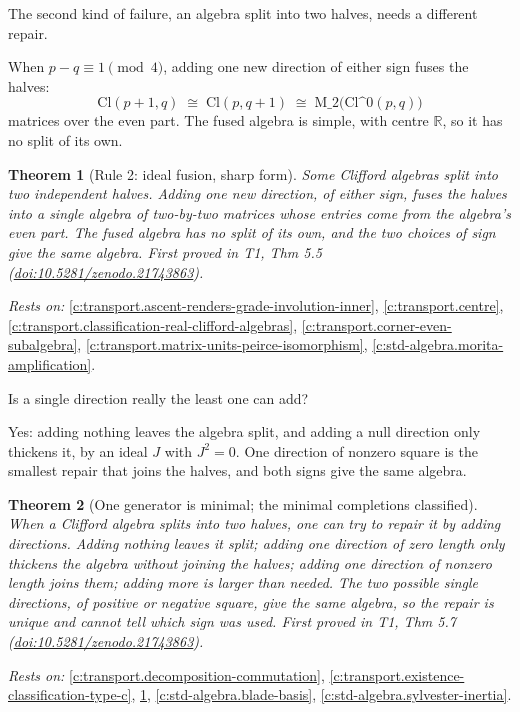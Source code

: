 \documentclass[11pt]{article}
\newtheorem{theorem}{Theorem}[section]
\theoremstyle{definition}
\theoremstyle{plain}
\providecommand{\Cl}{}\renewcommand{\Cl}{\mathrm{Cl}}
\providecommand{\Mat}{}\renewcommand{\Mat}{\mathrm{M}}
\providecommand{\R}{}\renewcommand{\R}{\mathbb{R}}
\begin{document}
The second kind of failure, an algebra split into two halves, needs a different repair.

When $p - q \equiv 1 \pmod 4$, adding one new direction of either sign fuses the halves: \[ \Cl(p{+}1,q) \;\cong\; \Cl(p,q{+}1) \;\cong\; \Mat\_2\bigl(\Cl\^{}0(p,q)\bigr) \] matrices over the even part. The fused algebra is simple, with centre $\R$, so it has no split of its own.

\begin{theorem}[Rule 2: ideal fusion, sharp form]\label{c:transport.rule-2-ideal-fusion-sharp-form}
Some Clifford algebras split into two independent halves. Adding one new direction, of either sign, fuses the halves into a single algebra of two-by-two matrices whose entries come from the algebra's even part. The fused algebra has no split of its own, and the two choices of sign give the same algebra.
\emph{First proved in} T1, Thm 5.5 (\href{https://doi.org/10.5281/zenodo.21743863}{doi:10.5281/zenodo.21743863}).
\end{theorem}
\noindent\emph{Rests on:} \ref{c:transport.ascent-renders-grade-involution-inner}, \ref{c:transport.centre}, \ref{c:transport.classification-real-clifford-algebras}, \ref{c:transport.corner-even-subalgebra}, \ref{c:transport.matrix-units-peirce-isomorphism}, \ref{c:std-algebra.morita-amplification}.

Is a single direction really the least one can add?

Yes: adding nothing leaves the algebra split, and adding a null direction only thickens it, by an ideal $J$ with $J^2 = 0$. One direction of nonzero square is the smallest repair that joins the halves, and both signs give the same algebra.

\begin{theorem}[One generator is minimal; the minimal completions classified]\label{c:transport.one-generator-minimal-minimal-completions-classified}
When a Clifford algebra splits into two halves, one can try to repair it by adding directions. Adding nothing leaves it split; adding one direction of zero length only thickens the algebra without joining the halves; adding one direction of nonzero length joins them; adding more is larger than needed. The two possible single directions, of positive or negative square, give the same algebra, so the repair is unique and cannot tell which sign was used.
\emph{First proved in} T1, Thm 5.7 (\href{https://doi.org/10.5281/zenodo.21743863}{doi:10.5281/zenodo.21743863}).
\end{theorem}
\noindent\emph{Rests on:} \ref{c:transport.decomposition-commutation}, \ref{c:transport.existence-classification-type-c}, \ref{c:transport.rule-2-ideal-fusion-sharp-form}, \ref{c:std-algebra.blade-basis}, \ref{c:std-algebra.sylvester-inertia}.
\end{document}
